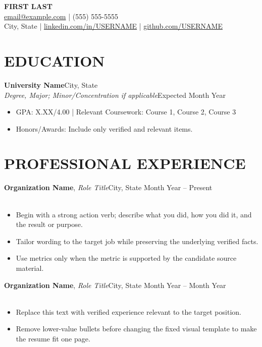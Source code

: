 \documentclass[10pt,letterpaper]{article}
\newcommand{\entry}[4]{%
  \textbf{#1}\if\relax\detokenize{#2}\relax\else, \textit{#2}\fi\hfill #3\\[-1pt]
  \if\relax\detokenize{#4}\relax\else #4\\[-1pt]\fi
}
\newcommand{\eduentry}[4]{%
  \textbf{#1}\hfill #3\\[-1pt]
  \textit{#2}\hfill #4\\[-1pt]
}
\begin{document}
\begin{center}
    {\LARGE\bfseries FIRST LAST}\\[2pt]
    \href{mailto:email@example.com}{email@example.com} \;|\; (555) 555-5555\\[-1pt]
    City, State \;|\; \href{https://www.linkedin.com/in/USERNAME}{linkedin.com/in/USERNAME} \;|\;
    \href{https://github.com/USERNAME}{github.com/USERNAME}
\end{center}
\vspace{-5pt}

\section*{EDUCATION}
\eduentry{University Name}{Degree, Major; Minor/Concentration if applicable}{City, State}{Expected Month Year}
\begin{itemize}
  \item GPA: X.XX/4.00 \;|\; Relevant Coursework: Course 1, Course 2, Course 3
  \item Honors/Awards: Include only verified and relevant items.
\end{itemize}

\section*{PROFESSIONAL EXPERIENCE}
\entry{Organization Name}{Role Title}{City, State \hspace{0.2em} Month Year -- Present}{}
\begin{itemize}
  \item Begin with a strong action verb; describe what you did, how you did it, and the result or purpose.
  \item Tailor wording to the target job while preserving the underlying verified facts.
  \item Use metrics only when the metric is supported by the candidate source material.
\end{itemize}

\entry{Organization Name}{Role Title}{City, State \hspace{0.2em} Month Year -- Month Year}{}
\begin{itemize}
  \item Replace this text with verified experience relevant to the target position.
  \item Remove lower-value bullets before changing the fixed visual template to make the resume fit one page.
\end{itemize}
\end{document}
